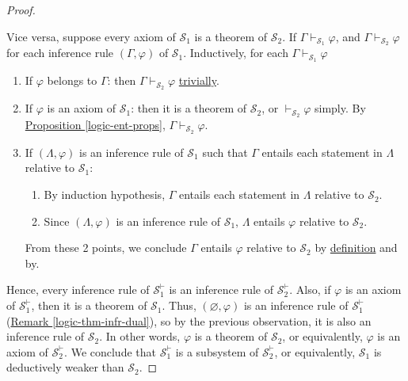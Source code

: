 \documentclass{treatise}
\begin{document}
\begin{shaded}
\begin{proof}
\begin{enumerate}
\end{enumerate}
Vice versa, suppose every axiom of $\mathcal{S}_1$ is a theorem of $\mathcal{S}_2$. If $\Gamma \vdash_{\mathcal{S}_1} \varphi$, and $\Gamma \vdash_{\mathcal{S}_2} \varphi$ for each inference rule $(\Gamma, \varphi)$ of $\mathcal{S}_1$. Inductively, for each $\Gamma \vdash_{\mathcal{S}_1} \varphi$
\begin{enumerate}
    \item If $\varphi$ belongs to $\Gamma$: then $\Gamma \vdash_{\mathcal{S}_2} \varphi$ \hyperref[logic-ent-hyp]{trivially}.
    \item If $\varphi$ is an axiom of $\mathcal{S}_1$: then it is a theorem of $\mathcal{S}_2$, or $\vdash_{\mathcal{S}_2} \varphi$ simply. By \hyperref[logic-ent-props]{Proposition \ref*{logic-ent-props}}, $\Gamma \vdash_{\mathcal{S}_2} \varphi$.
    \item If $(\Lambda, \varphi)$ is an inference rule of $\mathcal{S}_1$ such that $\Gamma$ entails each statement in $\Lambda$ relative to $\mathcal{S}_1$:
    \begin{enumerate}
        \item By induction hypothesis, $\Gamma$ entails each statement in $\Lambda$ relative to $\mathcal{S}_2$.
        \item Since $(\Lambda, \varphi)$ is an inference rule of $\mathcal{S}_1$, $\Lambda$ entails $\varphi$ relative to $\mathcal{S}_2$.
    \end{enumerate}
    From these 2 points, we conclude $\Gamma$ entails $\varphi$ relative to $\mathcal{S}_2$ by \hyperref[logic-ent-rule]{definition} and by.
\end{enumerate}
Hence, every inference rule of $\mathcal{S}_1^\vdash$ is an inference rule of $\mathcal{S}_2^\vdash$. Also, if $\varphi$ is an axiom of $\mathcal{S}_1^\vdash$, then it is a theorem of $\mathcal{S}_1$. Thus, $(\varnothing, \varphi)$ is an inference rule of $\mathcal{S}_1^\vdash$ (\hyperref[logic-thm-infr-dual]{Remark \ref*{logic-thm-infr-dual}}), so by the previous observation, it is also an inference rule of $\mathcal{S}_2$. In other words, $\varphi$ is a theorem of $\mathcal{S}_2$, or equivalently, $\varphi$ is an axiom of $\mathcal{S}_2^\vdash$. We conclude that $\mathcal{S}_1^\vdash$ is a subsystem of $\mathcal{S}_2^\vdash$, or equivalently, $\mathcal{S}_1$ is deductively weaker than $\mathcal{S}_2$.
\end{proof}

\newpage


\end{shaded}
\end{document}
